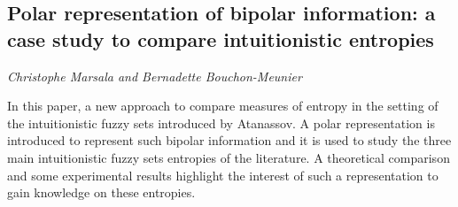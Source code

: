 \documentclass[../booklet.tex]{subfiles}
\begin{document}
\subsection[Polar representation of bipolar information: a case study to compare intuitionistic entropies. {\it Christophe Marsala and Bernadette Bouchon-Meunier}]{Polar representation of bipolar information: a case study to compare intuitionistic entropies}
 

\begin{center}
  {\it Christophe Marsala and Bernadette Bouchon-Meunier}
\end{center}



  In this paper, a new approach to compare measures of entropy in the setting of the
  intuitionistic fuzzy sets introduced by Ata\-nas\-sov.  A polar representation is
  introduced to represent such bipolar information and it is used to study the three main
  intuitionistic fuzzy sets entropies of the literature. A theoretical comparison and some
  experimental results highlight the interest of such a representation to gain knowledge
  on these entropies.

\end{document}
